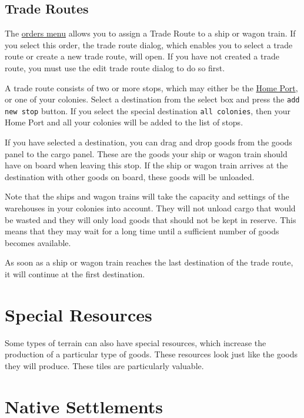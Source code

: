\documentclass[12pt]{book}
\begin{document}
\hypertarget{Trade Routes}{\subsection{Trade Routes}}

The \hyperlink{orders menu}{orders menu} allows you to assign a Trade
Route to a ship or wagon train. If you select this order, the trade
route dialog, which enables you to select a trade route or create a
new trade route, will open. If you have not created a trade route, you
must use the edit trade route dialog to do so first.

A trade route consists of two or more stops, which may either be the
\hyperlink{Home Port}{Home Port}, or one of your colonies. Select a
destination from the select box and press the \texttt{add new stop}
button. If you select the special destination \texttt{all colonies},
then your Home Port and all your colonies will be added to the list of
stops.

If you have selected a destination, you can drag and drop goods from
the goods panel to the cargo panel. These are the goods your ship or
wagon train should have on board when leaving this stop. If the ship
or wagon train arrives at the destination with other goods on board,
these goods will be unloaded.

Note that the ships and wagon trains will take the capacity and
settings of the warehouses in your colonies into account. They will
not unload cargo that would be wasted and they will only load goods
that should not be kept in reserve. This means that they may wait
for a long time until a sufficient number of goods becomes available.

As soon as a ship or wagon train reaches the last destination of the
trade route, it will continue at the first destination.


\hypertarget{Resources}{\section{Special Resources}}

Some types of terrain can also have special resources, which increase
the production of a particular type of goods. These resources look
just like the goods they will produce. These tiles are particularly
valuable.


\hypertarget{Native Settlements}{\section{Native Settlements}}
\end{document}
